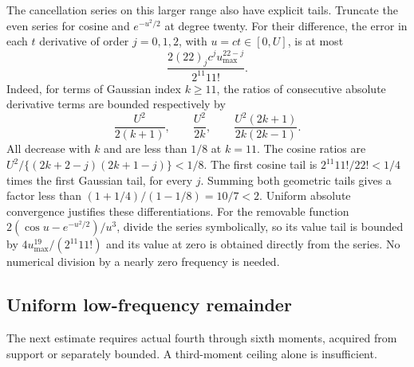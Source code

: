 The cancellation series on this larger range also have explicit tails.
Truncate the even series for cosine and $e^{-u^2/2}$ at degree twenty.
For their difference, the error in each $t$ derivative of order
$j=0,1,2$, with $u=ct\in[0,U]$, is at most
\[
 \frac{2(22)_j c^j u_{\max}^{22-j}}{2^{11}11!}.
\]
Indeed, for terms of Gaussian index $k\ge11$, the ratios of consecutive
absolute derivative terms are bounded respectively by
\[
 \frac{U^2}{2(k+1)},\qquad \frac{U^2}{2k},\qquad
 \frac{U^2(2k+1)}{2k(2k-1)}.
\]
All decrease with $k$ and are less than $1/8$ at $k=11$.
The cosine ratios are
$U^2/\{(2k+2-j)(2k+1-j)\}<1/8$.
The first cosine tail is $2^{11}11!/22!<1/4$ times the first Gaussian
tail, for every $j$. Summing both geometric tails gives a factor less
than $(1+1/4)/(1-1/8)=10/7<2$.
Uniform absolute convergence justifies these differentiations.
For the removable function $2(\cos u-e^{-u^2/2})/u^3$, divide the series
symbolically, so its value tail is bounded by
$4u_{\max}^{19}/(2^{11}11!)$ and its value at zero is obtained directly
from the series. No numerical division by a nearly zero frequency is
needed.

\subsection{Uniform low-frequency remainder}

The next estimate requires actual fourth through sixth moments, acquired
from support or separately bounded. A third-moment ceiling alone is insufficient.

